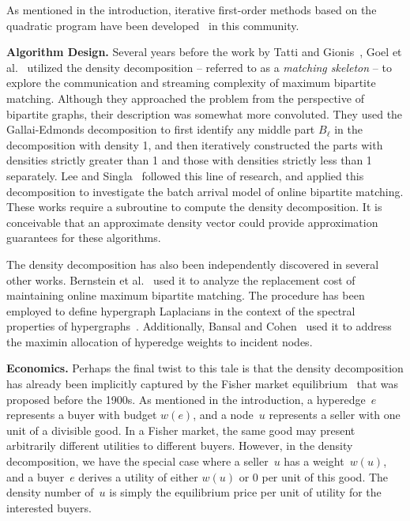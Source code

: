 As mentioned in the introduction,
iterative first-order methods based on the quadratic program
have been developed~\cite{DBLP:conf/www/DanischCS17,DBLP:conf/www/BoobGPSTWW20,DBLP:journals/pvldb/SunDCS20,DBLP:conf/nips/HarbQC22} in this community.



\noindent \textbf{Algorithm Design.}  
Several years before the work by Tatti and Gionis~\cite{tatti2015density}, Goel et al.~\cite{DBLP:conf/soda/GoelKK12} utilized the density decomposition  -- referred to as a \emph{matching skeleton} -- to explore the communication and streaming complexity of maximum bipartite matching. Although they approached the problem from the perspective of bipartite graphs, their description was somewhat more convoluted. They used the Gallai-Edmonds decomposition to first identify any middle part $B_\ell$
in the decomposition with density 1, and then iteratively constructed the parts with densities strictly greater than 1 and those with densities strictly less than 1 separately.
Lee and Singla~\cite{DBLP:journals/talg/LeeS20} followed this line of research, and
applied this decomposition to investigate the batch arrival model of online bipartite matching.
These works require a subroutine to compute the density decomposition. It is conceivable that an approximate density vector could provide approximation guarantees for these algorithms.

The density decomposition has also been independently discovered in several other works. Bernstein et al.~\cite{DBLP:journals/jacm/BernsteinHR19} used it to analyze the replacement cost of maintaining online maximum bipartite matching. The procedure has been employed to define hypergraph Laplacians in the context of the spectral properties of hypergraphs~\cite{DBLP:journals/jacm/ChanLTZ18}. Additionally, Bansal and Cohen~\cite{DBLP:conf/waoa/BansalC21} used it to address the maximin allocation of hyperedge weights to incident nodes.

\noindent \textbf{Economics.}
Perhaps the final twist to this tale is that the density decomposition has already been implicitly captured by the Fisher market equilibrium~\cite{fisher1892} that was proposed before the 1900s. As mentioned in the introduction, a hyperedge~$e$ represents a buyer with budget $w(e)$, and a node~$u$ represents a seller with one unit of a divisible good. In a Fisher market, 
the same good may present arbitrarily different utilities 
to different buyers.
However, in the density decomposition, we have the special case where a seller~$u$ has a weight~$w(u)$, and a buyer~$e$ derives a utility of either $w(u)$ or 0 per unit of this good. The density number of~$u$ is simply the equilibrium price per unit of utility for the interested buyers.


